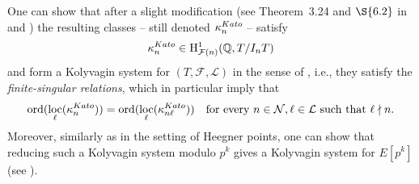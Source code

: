 \documentclass[10pt,reqno]{amsart}
\numberwithin{equation}{section}
\theoremstyle{plain}
\theoremstyle{definition}
\newtheorem{rmk}[thm]{Remark}
\theoremstyle{definition}
\theoremstyle{plain}
\theoremstyle{plain}
\theoremstyle{plain}
\theoremstyle{plain}
\theoremstyle{plain}
\theoremstyle{plain}
\DeclareMathOperator{\ord}{ord}
\newcommand{\Z}{\mathbb{Z}}
\newcommand{\Q}{\mathbb{Q}}
\DeclareMathOperator{\frob}{Frob}
\DeclareMathOperator{\loc}{loc}
\newcommand{\Lcal}{\mathcal{L}}
\newcommand{\Fcal}{\mathcal{F}}
\newcommand{\cL}{\mathcal{L}}
\newcommand{\cN}{\mathcal{N}}
\newcommand{\rH}{\mathrm{H}}
\begin{document}
%
One can show that after a slight modification (see Theorem~3.24 and $\S{6.2}$  in \cite{mazrub} and \cite[Thm.~4.3.1]{rubin-ES-KS}) the resulting classes -- still denoted $\kappa_n^{\rm Kato}$ --
satisfy
\[
\kappa_n^{\rm Kato}\in \rH^1_{\Fcal(n)}(\Q, T / I_n T)
\]
and form a Kolyvagin system for $(T,\Fcal,\mathcal{L})$ in the sense of \cite{mazrub}, i.e., they satisfy the \emph{finite-singular relations}, which in particular imply that
\begin{equation}\label{eq:finsingkato}
\ord(\loc_\ell(\kappa_n^{\rm Kato}))=\ord(\loc_\ell(\kappa^{\rm Kato}_{n\ell})) \ \ \text{ for every $n\in \cN, \ell\in\cL$ such that $\ell\nmid n$}.
\end{equation} 
%
%
Moreover, similarly as in the setting of Heegner points, one can show that 
reducing such a Kolyvagin system modulo $p^k$ gives a Kolyvagin system for $E[p^k]$ (see \cite[Prop. 5.2.9 and Prop. 6.2.2]{mazrub}).

\end{document}
